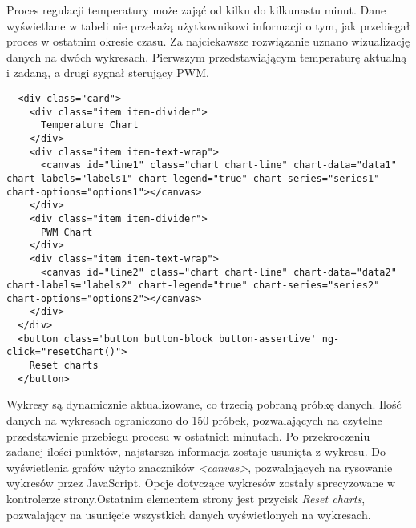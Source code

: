 Proces regulacji temperatury może zająć od kilku do kilkunastu minut. Dane wyświetlane w tabeli nie przekażą użytkownikowi informacji o tym, jak przebiegał proces w ostatnim okresie czasu. Za najciekawsze rozwiązanie uznano wizualizację danych na dwóch wykresach. Pierwszym przedstawiającym temperaturę aktualną i zadaną, a drugi sygnał sterujący PWM.
\begin{lstlisting} 
  <div class="card">
    <div class="item item-divider">
      Temperature Chart
    </div>
    <div class="item item-text-wrap">
      <canvas id="line1" class="chart chart-line" chart-data="data1" chart-labels="labels1" chart-legend="true" chart-series="series1" chart-options="options1"></canvas>
    </div>
    <div class="item item-divider">
      PWM Chart
    </div>
    <div class="item item-text-wrap">
      <canvas id="line2" class="chart chart-line" chart-data="data2" chart-labels="labels2" chart-legend="true" chart-series="series2" chart-options="options2"></canvas>
    </div>
  </div>
  <button class='button button-block button-assertive' ng-click="resetChart()">
    Reset charts
  </button>
\end{lstlisting}
Wykresy są dynamicznie aktualizowane, co trzecią pobraną próbkę danych. Ilość danych na wykresach ograniczono do 150 próbek, pozwalających na czytelne przedstawienie przebiegu procesu w ostatnich minutach. Po przekroczeniu zadanej ilości punktów, najstarsza informacja zostaje usunięta z wykresu. Do wyświetlenia grafów użyto znaczników \textit{<canvas>}, pozwalających na rysowanie wykresów przez JavaScript. Opcje dotyczące wykresów zostały sprecyzowane w kontrolerze strony.Ostatnim elementem strony jest przycisk \textit{Reset charts}, pozwalający na usunięcie wszystkich danych wyświetlonych na wykresach.

